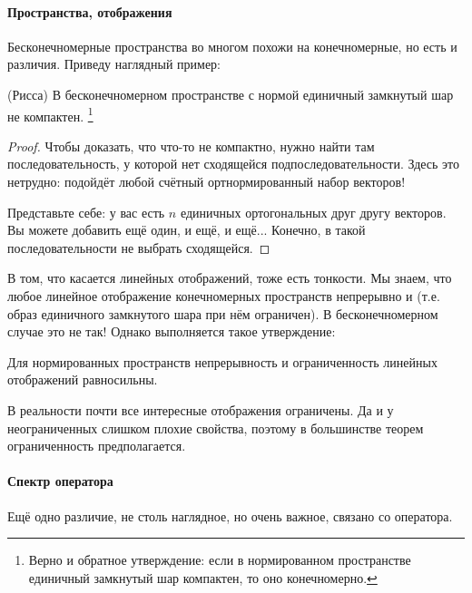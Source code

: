 \documentclass{trlnotes}
\begin{document}
    \paragraph{Пространства, отображения}
    Бесконечномерные пространства во многом похожи на конечномерные, но есть и различия. Приведу наглядный пример:

    \begin{thm}(Рисса)
        В бесконечномерном пространстве с нормой единичный замкнутый шар не компактен. \footnote{Верно и обратное утверждение: если в нормированном пространстве единичный замкнутый шар компактен, то оно конечномерно.}
        \begin{proof}
            Чтобы доказать, что что-то не компактно, нужно найти там последовательность, у которой нет сходящейся подпоследовательности. Здесь это нетрудно: подойдёт любой счётный ортнормированный набор векторов!

            Представьте себе: у вас есть $n$ единичных ортогональных друг другу векторов. Вы можете добавить ещё один, и ещё, и ещё... Конечно, в такой последовательности не выбрать сходящейся.
        \end{proof}
    \end{thm}

    В том, что касается линейных отображений, тоже есть тонкости. Мы знаем, что любое линейное отображение конечномерных пространств непрерывно и  (т.е. образ единичного замкнутого шара при нём ограничен). В бесконечномерном случае это не так! Однако выполняется такое утверждение:

    \begin{st}
        Для нормированных пространств непрерывность и ограниченность линейных отображений равносильны.
    \end{st}

    В реальности почти все интересные отображения ограничены. Да и у неограниченных слишком плохие свойства, поэтому в большинстве теорем ограниченность предполагается.

    \paragraph{Спектр оператора}

    Ещё одно различие, не столь наглядное, но очень важное, связано со  оператора.
\end{document}

